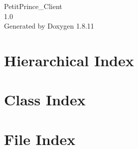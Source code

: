 \documentclass[twoside]{book}
\newcommand{\+}{\discretionary{\mbox{\scriptsize$\hookleftarrow$}}{}{}}
\newcommand{\clearemptydoublepage}{%
  \newpage{\pagestyle{empty}\cleardoublepage}%
}
\begin{document}
\hypersetup{pageanchor=false,
             bookmarksnumbered=true,
             pdfencoding=unicode
            }
\begin{titlepage}
\vspace*{7cm}
\begin{center}%
{\Large Petit\+Prince\+\_\+\+Client \\[1ex]\large 1.\+0 }\\
\vspace*{1cm}
{\large Generated by Doxygen 1.8.11}\\
\end{center}
\end{titlepage}
\clearemptydoublepage
\tableofcontents
\clearemptydoublepage
{}
\hypersetup{pageanchor=true}

\chapter{Hierarchical Index}

\chapter{Class Index}

\chapter{File Index}

\end{document}
